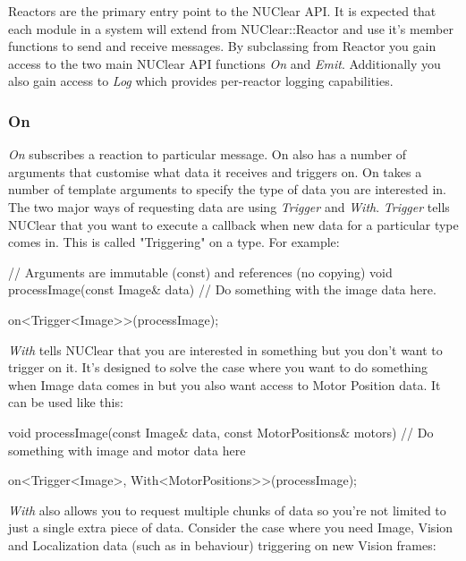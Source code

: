 \documentclass[english,12pt]{scrartcl}
\begin{document}
			Reactors are the primary entry point to the NUClear API. 
			It is expected that each module in a system will extend from NUClear::Reactor and use it's member functions to send and receive messages.
			By subclassing from Reactor you gain access to the two main NUClear API functions \emph{On} and \emph{Emit}. 
			Additionally you also gain access to \emph{Log} which provides per-reactor logging capabilities.
	
			\subsubsection{On}
				\emph{On} subscribes a reaction to particular message. 
				On also has a number of arguments that customise what data it receives and triggers on.
				On takes a number of template arguments to specify the type of data you are interested in. 
				The two major ways of requesting data are using \emph{Trigger} and \emph{With}.
				\emph{Trigger} tells NUClear that you want to execute a callback when new data for a particular type comes in.
				This is called "Triggering" on a type. 
				For example:
				
				\begin{cppcode}
					// Arguments are immutable (const) and references (no copying)
					void processImage(const Image& data) {
					    // Do something with the image data here.
					}
				
					on<Trigger<Image>>(processImage);
				\end{cppcode}
				
				\emph{With} tells NUClear that you are interested in something but you don't want to trigger on it. 
				It's designed to solve the case where you want to do something when Image data comes in but you also want access to Motor Position data.
				It can be used like this:
				
				\begin{cppcode}
					void processImage(const Image& data, const MotorPositions& motors) {
					    // Do something with image and motor data here
					}
					
					on<Trigger<Image>, With<MotorPositions>>(processImage);
				\end{cppcode}
				
				\emph{With} also allows you to request multiple chunks of data so you're not limited to just a single extra piece of data.
				Consider the case where you need Image, Vision and Localization data (such as in behaviour) triggering on new Vision frames:
				
\end{document}
